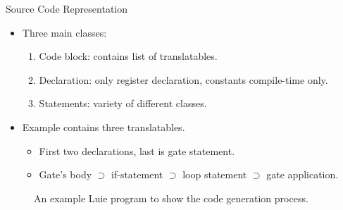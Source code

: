 \begin{frame}{Source Code Representation}
    \begin{minipage}{.60\textwidth}
        \begin{itemize}
            \item Three main classes:
            \begin{enumerate}
                \item Code block: contains list of translatables.
                \item Declaration: only register declaration, constants compile-time only.
                \item Statements: variety of different classes.
            \end{enumerate}
            \item Example contains three translatables.
            \begin{itemize}
                \item First two declarations, last is gate statement.
                \item Gate's body $\supset$ if-statement $\supset$ loop statement $\supset$ gate application.
            \end{itemize}
        \end{itemize}   
        \vfill
        \begin{figure}
            \centering
            
            \caption{An example Luie program to show the code generation process.}
        \end{figure} 
    \end{minipage}
    \begin{minipage}{.35\textwidth}
        \centering
        \begin{figure}[htp]
            \centering

\end{figure}
\end{minipage}
\end{frame}
